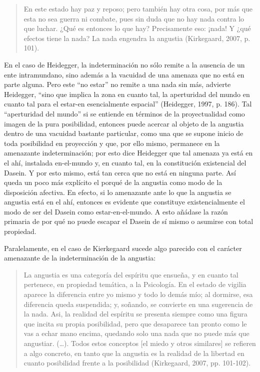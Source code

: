 \begin{refsection}
\begin{quote}
En este estado hay paz y reposo; pero también hay otra cosa, por más que esta no sea guerra ni combate, pues sin duda que no hay nada contra lo que luchar. ¿Qué es entonces lo que hay? Precisamente eso: ¡nada! Y ¿qué efectos tiene la nada? La nada engendra la angustia (Kirkegaard, 2007, p. 101).
\end{quote}

En el caso de Heidegger, la indeterminación no sólo remite a la ausencia de un ente intramundano, sino además a la vacuidad de una amenaza que no está en parte alguna. Pero este ``no estar'' no remite a una nada sin más, advierte Heidegger, ``sino que implica la zona en cuanto tal, la aperturidad del mundo en cuanto tal para el estar-en esencialmente espacial'' (Heidegger, 1997, p. 186). Tal ``aperturidad del mundo'' si se entiende en términos de la proyectualidad como imagen de la pura posibilidad, entonces puede acercar al objeto de la angustia dentro de una vacuidad bastante particular, como una que se supone inicio de toda posibilidad en proyección y que, por ello mismo, permanece en la amenazante indeterminación; por esto dice Heidegger que tal amenaza ya está en el ahí, instalada en-el-mundo y, en cuanto tal, en la constitución existencial del Dasein. Y por esto mismo, está tan cerca que no está en ninguna parte. Así queda un poco más explícito el porqué de la angustia como modo de la disposición afectiva. En efecto, si lo amenazante ante lo que la angustia se angustia está en el ahí, entonces es evidente que constituye existencialmente el modo de ser del Dasein como estar-en-el-mundo. A esto añádase la razón primaria de por qué no puede escapar el Dasein de sí mismo o asumirse con total propiedad.

Paralelamente, en el caso de Kierkegaard sucede algo parecido con el carácter amenazante de la indeterminación de la angustia:

\begin{quote}
La angustia es una categoría del espíritu que ensueña, y en cuanto tal pertenece, en propiedad temática, a la Psicología. En el estado de vigilia aparece la diferencia entre yo mismo y todo lo demás mío; al dormirse, esa diferencia queda suspendida; y, soñando, se convierte en una sugerencia de la nada. Asi, la realidad del espíritu se presenta siempre como una figura que incita su propia posibilidad, pero que desaparece tan pronto como le vas a echar mano encima, quedando solo una nada que no puede más que angustiar. (\ldots{}). Todos estos conceptos {[}el miedo y otros similares{]} se refieren a algo concreto, en tanto que la angustia es la realidad de la libertad en cuanto posibilidad frente a la posibilidad (Kirkegaard, 2007, pp. 101-102).
\end{quote}


\end{refsection}
